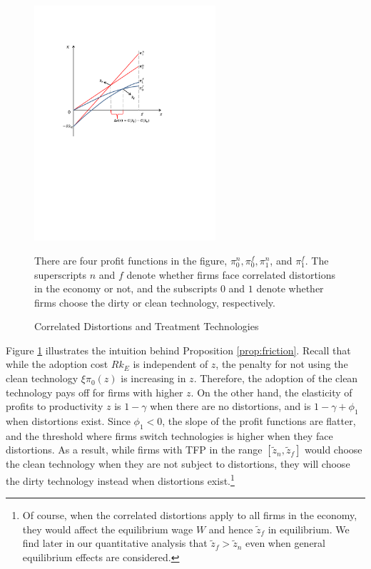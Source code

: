 \documentclass[AEJ]{AEA}
\begin{document}
\begin{figure}[t]
\begin{center}
    \includegraphics[width=0.60\textwidth]{./Figures/prod_tax_effect.pdf}
    \caption{Correlated Distortions and Treatment Technologies}
    \label{fig:constantp}
    \begin{figurenotes}
        There are four profit functions in the figure, $\pi_0^n, \pi_0^f, \pi_1^n$, and $\pi_1^f$. The superscripts $n$ and $f$ denote whether firms face correlated distortions in the economy or not, and the subscripts $0$ and $1$ denote whether firms choose the dirty or clean technology, respectively.
    \end{figurenotes}
\end{center}
\end{figure}
\noindent Figure \ref{fig:constantp} illustrates the intuition behind Proposition \ref{prop:friction}. Recall that while the adoption cost $Rk_E$ is independent of $z$, the penalty for not using the clean technology $\xi \pi_0(z)$ is increasing in $z$. Therefore, the adoption of the clean technology pays off for firms with higher $z$. On the other hand, the elasticity of profits to productivity $z$ is $1-\gamma$ when there are no distortions, and is $1-\gamma+\phi_1$ when distortions exist. Since $\phi_1 < 0$, the slope of the profit functions are flatter, and the threshold where firms switch technologies is higher when they face distortions. As a result, while firms with TFP in the range $[\tilde{z}_n, \tilde{z}_f]$ would choose the clean technology when they are not subject to distortions, they will choose the dirty technology instead when distortions exist.\footnote{Of course, when the correlated distortions apply to all firms in the economy, they would affect the equilibrium wage $W$ and hence $\tilde{z}_f$ in equilibrium. We find later in our quantitative analysis that $\tilde{z}_f > \tilde{z}_n$ even when general equilibrium effects are considered.}
\end{document}
